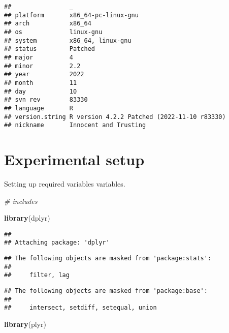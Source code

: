 \documentclass[]{book}
\newenvironment{Shaded}{\begin{snugshade}}{\end{snugshade}}
\newcommand{\CommentTok}[1]{\textcolor[rgb]{0.56,0.35,0.01}{\textit{#1}}}
\newcommand{\KeywordTok}[1]{\textcolor[rgb]{0.13,0.29,0.53}{\textbf{#1}}}
\newcommand{\NormalTok}[1]{#1}
\begin{document}
\begin{verbatim}
##                _                                          
## platform       x86_64-pc-linux-gnu                        
## arch           x86_64                                     
## os             linux-gnu                                  
## system         x86_64, linux-gnu                          
## status         Patched                                    
## major          4                                          
## minor          2.2                                        
## year           2022                                       
## month          11                                         
## day            10                                         
## svn rev        83330                                      
## language       R                                          
## version.string R version 4.2.2 Patched (2022-11-10 r83330)
## nickname       Innocent and Trusting
\end{verbatim}

\hypertarget{experimental-setup}{%
\section{Experimental setup}\label{experimental-setup}}

Setting up required variables variables.

\begin{Shaded}
\begin{Highlighting}[]
\CommentTok{# includes}

\KeywordTok{library}\NormalTok{(dplyr)}
\end{Highlighting}
\end{Shaded}

\begin{verbatim}
## 
## Attaching package: 'dplyr'
\end{verbatim}

\begin{verbatim}
## The following objects are masked from 'package:stats':
## 
##     filter, lag
\end{verbatim}

\begin{verbatim}
## The following objects are masked from 'package:base':
## 
##     intersect, setdiff, setequal, union
\end{verbatim}

\begin{Shaded}
\begin{Highlighting}[]
\KeywordTok{library}\NormalTok{(plyr)}
\end{Highlighting}
\end{Shaded}
\end{document}
